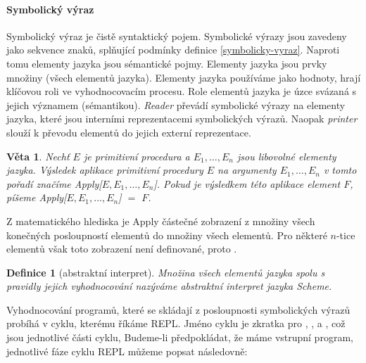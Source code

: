 \documentclass[10pt,a4paper]{article}
\newtheorem{veta}{Věta}
\newtheorem{definition}{Definice}
\begin{document}
    \paragraph{Symbolický výraz} Symbolický výraz je čistě syntaktický pojem. Symbolické výrazy jsou zavedeny jako sekvence znaků, splňující podmínky definice \ref{symbolicky-vyraz}. Naproti tomu elementy jazyka jsou sémantické pojmy. Elementy jazyka jsou prvky množiny (všech elementů jazyka). Elementy jazyka používáme jako hodnoty, hrají klíčovou roli ve vyhodnocovacím procesu. Role elementů jazyka je úzce svázaná s jejich významem (sémantikou). \textit{Reader} převádí symbolické výrazy na elementy jazyka, které jsou interními reprezentacemi symbolických výrazů. Naopak \textit{printer} slouží k převodu elementů do jejich externí reprezentace.
    \begin{veta}
      Nechť $E$ je primitivní procedura a $E_{1},\ldots,E_{n}$ jsou libovolné elementy jazyka. Výsledek \textit{aplikace primitivní procedury $E$ na argumenty $E_{1},\ldots,E_{n}$ v tomto pořadí} značíme Apply[$E,E_{1},\ldots,E_{n}$]. Pokud je výsledkem této aplikace element $F$, píšeme Apply[$E,E_{1},\ldots,E_{n}$] $=$ $F$.
    \end{veta}
    Z matematického hlediska je Apply částečné zobrazení z množiny všech konečných posloupností elementů do množiny všech elementů. Pro některé $n$-tice elementů však toto zobrazení není definované, proto .
    \begin{definition}[abstraktní interpret]\label{def-abstraktni-interpret}
      Množina všech elementů jazyka spolu s pravidly jejich vyhodnocování nazýváme \textit{abstraktní interpret jazyka Scheme}.
    \end{definition}
    Vyhodnocování programů, které se skládají z posloupnosti symbolických výrazů probíhá v cyklu, kterému říkáme REPL. Jméno cyklu je zkratka pro , ,  a , což jsou jednotlivé části cyklu, Budeme-li předpokládat, že máme vstrupní program, jednotlivé fáze cyklu REPL můžeme popsat následovně:
\end{document}
